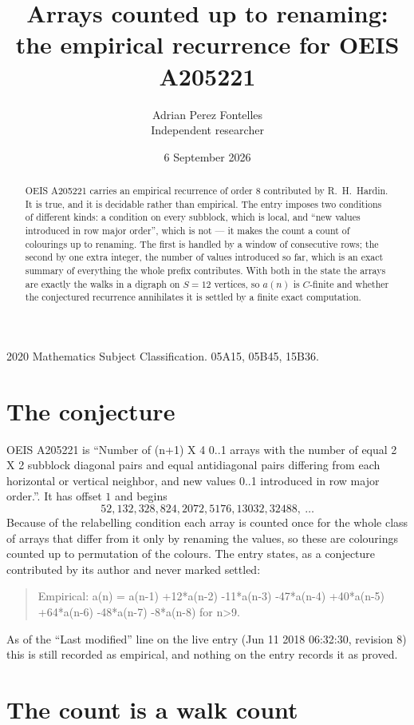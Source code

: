 \documentclass[11pt,a4paper]{article}
\title{Arrays counted up to renaming: the empirical recurrence for OEIS A205221}
\author{Adrian Perez Fontelles\\ \small Independent researcher}
\date{6 September 2026}
\theoremstyle{plain}
\theoremstyle{definition}
\begin{document}
\maketitle

\begin{abstract}
OEIS A205221 carries an empirical recurrence of order $8$ contributed by R.~H.~Hardin. It is
true, and it is decidable rather than empirical. The entry imposes two conditions of different
kinds: a condition on every subblock, which is local, and ``new values introduced in row major
order'', which is not --- it makes the count a count of colourings up to renaming. The first is
handled by a window of consecutive rows; the second by one extra integer, the number of values
introduced so far, which is an exact summary of everything the whole prefix contributes. With
both in the state the arrays are exactly the walks in a digraph on $S=12$ vertices, so $a(n)$
is $C$-finite and whether the conjectured recurrence annihilates it is settled by a finite
exact computation.
\end{abstract}

\noindent\small 2020 Mathematics Subject Classification. 05A15, 05B45, 15B36.\normalsize

\section{The conjecture}

OEIS A205221 is ``Number of (n+1) X 4 0..1 arrays with the number of equal 2 X 2 subblock diagonal pairs and equal antidiagonal pairs differing from each horizontal or vertical neighbor, and new values 0..1 introduced in row major order.''. It has offset $1$ and begins
\[
52, 132, 328, 824, 2072, 5176, 13032, 32488,\ \dots
\]
Because of the relabelling condition each array is counted once for the whole class of arrays that differ from it only by renaming the values, so these are colourings counted up to permutation of the colours.
The entry states, as a conjecture contributed by its author and never marked settled:
\begin{quote}
Empirical: a(n) = a(n-1) +12*a(n-2) -11*a(n-3) -47*a(n-4) +40*a(n-5) +64*a(n-6) -48*a(n-7) -8*a(n-8) for n>9.
\end{quote}
As of the ``Last modified'' line on the live entry (Jun 11 2018 06:32:30, revision 8) this is still
recorded as empirical, and nothing on the entry records it as proved.

\section{The count is a walk count}
\end{document}
